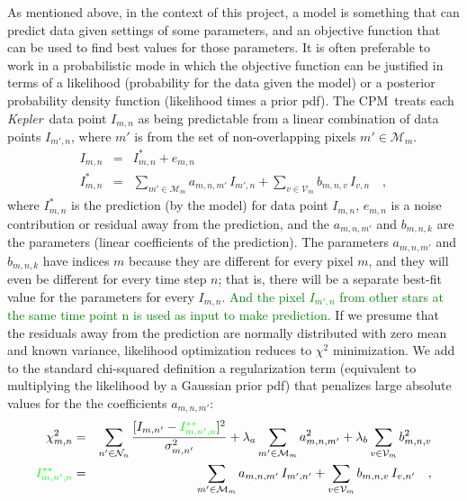 \documentclass[12pt, preprint]{aastex}
\newcommand{\project}[1]{\textsl{#1}}
\newcommand{\Kepler}{\project{Kepler}}
\newcommand{\name}{CPM}
\newcommand{\set}[1]{\mathcal{#1}}
\newcommand{\revise}[1]{\textcolor{green}{#1}}
\begin{document}
As mentioned above, in the context of this project,
  a model is something that can predict data given settings of some parameters,
  and an objective function that can be used to find best values for those parameters.
It is often preferable to work in a probabilistic mode in which the objective function can be justified
  in terms of a likelihood (probability for the data given the model)
  or a posterior probability density function (likelihood times a prior pdf).
The \name\ treats each \Kepler\ data point $I_{m,n}$ as being
  predictable from a linear combination of data points $I_{m',n}$,
  where $m'$ is from the set of non-overlapping pixels $m'\in\set{M}_m$.
\begin{eqnarray}
I_{m,n}         &=& I^{\ast}_{m,n} + e_{m,n}
\\
I^{\ast}_{m,n}  &=& \sum_{m'\in\set{M}_m} a_{m,n,m'}\,I_{m',n} + \sum_{v\in\set{V}_m} b_{m,n,v}\,I_{v,n}
\quad,
\end{eqnarray}
where $I^{\ast}_{m,n}$ is the prediction (by the model) for data point $I_{m,n}$,
  $e_{m,n}$ is a noise contribution or residual away from the prediction,
  and the $a_{m,n,m'}$ and $b_{m,n,k}$ are the parameters (linear coefficients of the prediction).
The parameters $a_{m,n,m'}$ and $b_{m,n,k}$ have indices $m$ because
  they are different for every pixel $m$,
  and they will even be different for every time step $n$;
  that is, there will be a separate best-fit value for the parameters for every $I_{m,n}$.
\revise{And the pixel $I_{m',n}$ from other stars at the same time point n is used as input to make prediction.}
If we presume that the residuals away from the prediction are normally distributed with zero mean and known variance, likelihood optimization reduces to $\chi^2$ minimization.
We add to the standard chi-squared definition a regularization term
  (equivalent to multiplying the likelihood by a Gaussian prior pdf)
  that penalizes large absolute values for the the coefficients $a_{m,n,m'}$:
\begin{eqnarray}
\chi^2_{m,n}    &=& \sum_{n'\in\set{N}_n} \frac{[I_{m,n'} - \revise{I^{\ast\ast}_{m,n',n}}]^2}{\sigma^2_{m,n'}}
                 + \lambda_{a}\sum_{m'\in\set{M}_m}a_{m,n,m'}^2 + \lambda_{b}\sum_{v\in\set{V}_m}b_{m,n,v}^2
\\
\revise{I^{\ast\ast}_{m,n',n}} &=& \sum_{m'\in\set{M}_m} a_{m,n,m'}\,I_{m',n'} + \sum_{v\in\set{V}_m} b_{m,n,v}\,I_{v,n'}
\quad,
\end{eqnarray}
\end{document}
